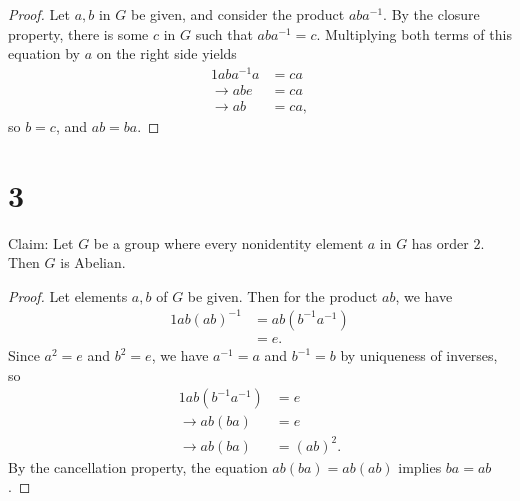 \documentclass{article}
\begin{document}
\begin{proof} 
    Let $a, b$ in $G$ be given, and consider the product $aba^{-1}$.  By the closure 
    property, there is some $c$ in $G$ such that $aba^{-1} = c$.  Multiplying  
    both terms of this equation by $a$ on the right side yields 
    \begin{alignat*}{1}
        aba^{-1} a &= c a\\ 
        \rightarrow a b e &= c a \\ 
        \rightarrow a b &= c a,
    \end{alignat*}
    so $b = c$, and $ab = ba$.
\end{proof}

\section*{3}

Claim: Let $G$ be a group where every nonidentity element $a$ in $G$ has order $2$.  Then 
$G$ is Abelian.

\begin{proof} 
    Let elements $a, b$ of $G$ be given.  Then for the product $ab$, we have 
    \begin{alignat*}{1}
        ab(ab)^{-1} &= ab(b^{-1}a^{-1}) \\
        &= e.
    \end{alignat*}
    Since $a^2 = e$ and $b^2 = e$, we have $a^{-1} = a$ and $b^{-1} = b$ by uniqueness 
    of inverses, so 
    \begin{alignat*}{1}
        ab(b^{-1}a^{-1}) &= e \\
        \rightarrow ab(ba) &= e \\
        \rightarrow ab(ba) &= (ab)^2.
    \end{alignat*}
    By the cancellation property, the equation $ab(ba) = ab(ab)$ implies $ba = ab$.
\end{proof}
\end{document}
